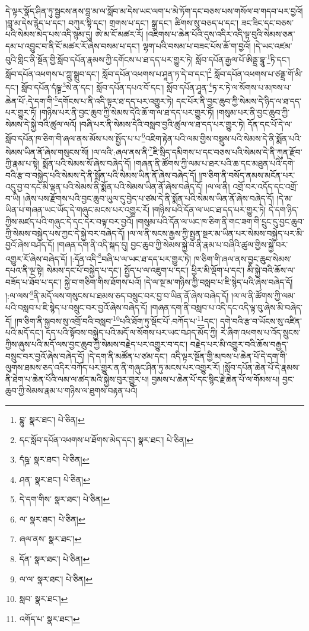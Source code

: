 དེ་ལྟར་སྣོད་ཤིན་ཏུ་སྦྱངས་ནས་བླ་མ་ལ་སློབ་མ་དེས་ཡང་ལག་པ་མེ་ཏོག་དང་བཅས་པས་གསོལ་བ་གདབ་པར་བྱའོ། །བླ་མ་དེས་རྙེད་པ་དང་། བཀུར་སྟི་དང་། གྲགས་པ་དང་། སྒྲ་དང་། ཚིགས་སུ་བཅད་པ་དང་། ཟང་ཟིང་དང་བཅས་པའི་སེམས་མེད་པས་འདི་སྙམ་དུ། ཨེ་མ་ངོ་མཚར་རོ། །འཇིགས་པ་ཆེན་པོའི་དུས་འདིར་འདི་ལྟ་བུའི་སེམས་ཅན་དམ་པ་འབྱུང་བ་ནི་ངོ་མཚར་རོ་ཞེས་བསམ་པ་དང་། ལྷག་པའི་བསམ་པ་བཟང་པོས་ཆོ་ག་བྱའོ། །དེ་ཡང་འཛམ་བུའི་གླིང་ནི་སྔོན་གྱི་སློབ་དཔོན་རྣམས་ཀྱི་དགོངས་པ་ཐ་དད་པར་གྱུར་ཏེ། སློབ་དཔོན་རྒྱལ་པོ་ཨིནྡྲ་བྷཱུ་\footnote{བྷུ་  སྣར་ཐང་།  པེ་ཅིན། }ཏི་དང་། སློབ་དཔོན་འཕགས་པ་ཀླུ་སྒྲུབ་དང་། སློབ་དཔོན་འཕགས་པ་ཤཱན་ཏ་དེ་བ་དང་།\footnote{དང་སློབ་དཔོན་འཕགས་པ་ཐོགས་མེད་དང་།  སྣར་ཐང་།  པེ་ཅིན། } སློབ་དཔོན་འཕགས་པ་ཙནྡྲ་གོ་མི་དང་། སློབ་དཔོན་དཾཥྚྲ་\footnote{དཾཥྜ་  སྣར་ཐང་།  པེ་ཅིན། }སེ་ན་དང་། སློབ་དཔོན་དཔའ་བོ་དང་། སློབ་དཔོན་ཤཱན་\footnote{ཤན་  སྣར་ཐང་།  པེ་ཅིན། }ཏ་ར་ཏེ་ལ་སོགས་པ་མཁས་པ་ཆེན་པོ་:དེ་དག་གི་\footnote{དེ་དག་གིས་  སྣར་ཐང་།  པེ་ཅིན། }དགོངས་པ་ནི་འདི་ལྟར་ཐ་དད་པར་འགྱུར་ཏེ། དང་པོར་ནི་བྱང་ཆུབ་ཀྱི་སེམས་དེ་ཉིད་ལ་ཐ་དད་པར་གྱུར་ཏོ། །གཉིས་པར་ནི་བྱང་ཆུབ་ཀྱི་སེམས་དེའི་ཆོ་ག་ལ་ཐ་དད་པར་གྱུར་ཏོ། །གསུམ་པར་ནི་བྱང་ཆུབ་ཀྱི་སེམས་དེ་སྐྱེ་བའི་ཚུལ་ལའོ། །བཞི་པར་ནི་སེམས་དེའི་བསླབ་བྱའི་ཚུལ་ལ་ཐ་དད་པར་གྱུར་ཏེ། དོན་དང་པོ་དེ་ལ་སློབ་དཔོན་ཁ་ཅིག་གི་ཞལ་ནས་མོས་པས་སྤྱོད་པ་པ་\footnote{ལ་  སྣར་ཐང་།  པེ་ཅིན། }འཇིག་རྟེན་པའི་ལམ་གྱིས་བསྡུས་པའི་སེམས་དེ་ནི་སྨོན་པའི་སེམས་ཡིན་ནོ་ཞེས་གསུངས་སོ། །ལ་ལའི་:ཞལ་ནས་ནི་\footnote{ཞལ་ནས་  སྣར་ཐང་། }ཇི་སྲིད་དམིགས་པ་དང་བཅས་པའི་སེམས་དེ་ནི་ཀུན་རྫོབ་ཀྱི་རྣམ་པ་སྟེ། སྨོན་པའི་སེམས་སོ་ཞེས་བཞེད་དོ། །གཞན་ནི་ཚོགས་ཀྱི་ལམ་པ་ཐར་པའི་ཆ་དང་མཐུན་པའི་དགེ་བའི་རྩ་བ་བསྐྱེད་པའི་སེམས་དེ་ནི་སྨོན་པའི་སེམས་ཡིན་ནོ་ཞེས་བཞེད་དོ། །ཁ་ཅིག་ནི་བསོད་ནམས་མངོན་པར་འདུ་བྱ་བ་དང་མི་ལྡན་པའི་སེམས་ནི་སྨོན་པའི་སེམས་ཡིན་ནོ་ཞེས་བཞེད་དོ། །ལ་ལ་ནི། འགྲོ་བར་འདོད་དང་འགྲོ་བ་ཡི། །ཞེས་པས་རྫོགས་པའི་བྱང་ཆུབ་ཡུལ་དུ་བྱེད་པ་ཙམ་དེ་ནི་སྨོན་པའི་སེམས་ཡིན་ནོ་ཞེས་བཞེད་དོ། །དེ་མ་ཡིན་པ་གཞན་ཡང་ཡོད་དེ་གཞུང་མངས་པར་འགྱུར་རོ། །གཉིས་པའི་དོན་ལ་ཡང་ཐ་དད་པར་གྱུར་ཏེ། དེ་དག་ཉིད་ཀྱིས་མཛད་པའི་གཞུང་དེ་དང་དེར་བལྟ་བར་བྱའོ། །གསུམ་པའི་དོན་ལ་ཡང་ཁ་ཅིག་ནི་གང་ཟག་གི་དྲུང་དུ་བྱང་ཆུབ་ཀྱི་སེམས་བསྐྱེད་པས་ཀྱང་དེ་སྐྱེ་བར་བཞེད་དོ། །ལ་ལ་ནི་སངས་རྒྱས་ཀྱི་སྤྱན་སྔར་མ་ཡིན་པར་སེམས་བསྐྱེད་པར་མི་བྱའོ་ཞེས་བཤད་དོ། །གཞན་དག་ནི་འདི་སྐད་དུ། བྱང་ཆུབ་ཀྱི་སེམས་སྐྱེ་བ་ནི་རྣམ་པ་བཞིའི་ཚུལ་གྱིས་སྐྱེ་བར་འགྱུར་རོ་ཞེས་བཞེད་དོ། །:དོན་འདི་\footnote{དོན་  སྣར་ཐང་།  པེ་ཅིན། }བཞི་པ་ལ་ཡང་ཐ་དད་པར་གྱུར་ཏེ། ཁ་ཅིག་གི་ཞལ་ནས་བྱང་ཆུབ་སེམས་དཔའ་ནི་ལྔ་སྟེ། སེམས་དང་པོ་བསྐྱེད་པ་དང་། སྤྱོད་པ་ལ་འཇུག་པ་དང་། ཕྱིར་མི་ལྡོག་པ་དང་། མི་སྐྱེ་བའི་ཆོས་ལ་བཟོད་པ་ཐོབ་པ་དང་། སྐྱེ་བ་གཅིག་གིས་ཐོགས་པའོ། །དེ་ལ་སྔ་མ་གཉིས་ཀྱི་བསླབ་པ་ཇི་སྙེད་པའི་ཞེས་བཞེད་དོ། །:ལ་ལས་\footnote{ལ་ལ་  སྣར་ཐང་།  པེ་ཅིན། }ནི་མདོ་ལས་གསུངས་པ་ཐམས་ཅད་བསྲུང་བར་བྱ་བ་ཡིན་ནོ་ཞེས་བཞེད་དོ། །ལ་ལ་ནི་ཚོགས་ཀྱི་ལམ་པའི་བསླབ་པ་ཇི་སྙེད་པ་བསྲུང་བར་བྱའོ་ཞེས་བཞེད་དོ། །གཞན་དག་ནི་བསླབ་པ་འདི་དང་འདི་ལྟ་བུ་ཞེས་མི་བཞེད་དོ། །ཁ་ཅིག་ནི་སྐྱབས་སུ་འགྲོ་བའི་བསླབ་\footnote{སླབ་  སྣར་ཐང་། }པའི་ཐོག་ཏུ་སྡོང་པོ་:བཀོད་པ་\footnote{འགོད་པ་  སྣར་ཐང་། }དང་། དགེ་བའི་རྩ་བ་ཡོངས་སུ་འཛིན་པའི་མདོ་དང་། དད་པའི་སྟོབས་བསྐྱེད་པའི་མདོ་ལ་སོགས་པར་ཡང་བཤད་མོད་ཀྱི། རེ་ཞིག་འཕགས་པ་འོད་སྲུངས་ཀྱིས་ཞུས་པའི་མདོ་ལས་བྱང་ཆུབ་ཀྱི་སེམས་བརྗེད་པར་འགྱུར་བ་དང་། བརྗེད་པར་མི་འགྱུར་བའི་ཆོས་བརྒྱད་བསྲུང་བར་བྱའོ་ཞེས་བཞེད་དོ། །དེ་དག་ནི་མཚོན་པ་ཙམ་དང་། འདི་ལྟར་སྔོན་གྱི་མཁས་པ་ཆེན་པོ་དེ་དག་གི་ལུགས་ཐམས་ཅད་འདིར་བཀོད་པར་གྱུར་ན་ནི་གཞུང་ཤིན་ཏུ་མངས་པར་འགྱུར་རོ། །སློབ་དཔོན་ཆེན་པོ་དེ་རྣམས་ནི་ཐེག་པ་ཆེན་པོའི་ལམ་ལ་ཚད་མའི་སྐྱེས་བུར་གྱུར་པ། བྱམས་པ་ཆེན་པོ་དང་སྙིང་རྗེ་ཆེན་པོ་ལ་གོམས་པ། བྱང་ཆུབ་ཀྱི་སེམས་རྣམ་པ་གཉིས་ལ་ཐུགས་བརྟན་པའོ། 